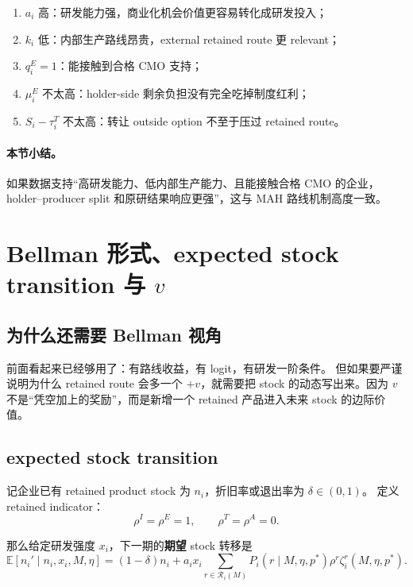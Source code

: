 \documentclass[12pt,UTF8]{ctexart}
\newcommand{\E}{\mathbb{E}}
\newcommand{\Rset}{\mathcal{R}}
\theoremstyle{plain}
\theoremstyle{remark}
\begin{document}
\begin{enumerate}[leftmargin=2em]
    \item $a_i$ 高：研发能力强，商业化机会价值更容易转化成研发投入；
    \item $k_i$ 低：内部生产路线昂贵，external retained route 更 relevant；
    \item $q_i^E=1$：能接触到合格 CMO 支持；
    \item $\mu_i^E$ 不太高：holder-side 剩余负担没有完全吃掉制度红利；
    \item $S_i-\tau_i^T$ 不太高：转让 outside option 不至于压过 retained route。
\end{enumerate}

\paragraph{本节小结。}
如果数据支持“高研发能力、低内部生产能力、且能接触合格 CMO 的企业，
holder--producer split 和原研结果响应更强”，这与 MAH 路线机制高度一致。

\section{Bellman 形式、expected stock transition 与 \texorpdfstring{$v$}{延续价值}}

\subsection{为什么还需要 Bellman 视角}

前面看起来已经够用了：有路线收益，有 logit，有研发一阶条件。
但如果要严谨说明为什么 retained route 会多一个 $+v$，就需要把 stock
的动态写出来。因为 $v$ 不是“凭空加上的奖励”，而是新增一个 retained
产品进入未来 stock 的边际价值。

\subsection{expected stock transition}

记企业已有 retained product stock 为 $n_i$，折旧率或退出率为 $\delta\in(0,1)$。
定义 retained indicator：
\[
\rho^I=\rho^E=1,\qquad
\rho^T=\rho^A=0.
\]

那么给定研发强度 $x_i$，下一期的\textbf{期望} stock 转移是
\begin{equation}
\E[n_i' \mid n_i,x_i,M,\eta]
=
(1-\delta)n_i
+
a_i x_i
\sum_{r\in\Rset_i(M)}
P_i(r\mid M,\eta,p^*)
\rho^r
\zeta_i^r(M,\eta,p^*).
\label{eq:stock_transition}
\end{equation}
\end{document}
